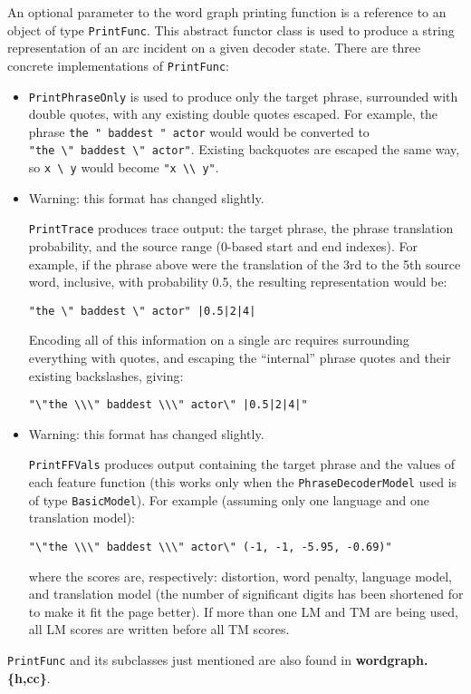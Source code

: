 \documentclass[12pt]{amsart} \usepackage{epsfig} \usepackage{rotating}
\newcommand{\file}{\textbf} \newcommand{\url}{\underline}
\newcommand{\code}{\small\texttt}
\begin{document}
An optional parameter to the word graph printing function is a reference to an
object of type \code{PrintFunc}.  This abstract functor class is used to
produce a string representation of an arc incident on a given decoder state.
There are three concrete implementations of \code{PrintFunc}:

\begin{itemize}
\item
\code{PrintPhraseOnly} is used to produce only the target phrase,
surrounded with double quotes, with any existing
double quotes escaped. For example, the phrase 
\verb/the " baddest " actor/ would would be converted to \\
\verb/"the \" baddest \" actor"/. Existing backquotes are escaped the same
way, so \verb/x \ y/ would become \verb/"x \\ y"/.

\item
Warning: this format has changed slightly.

\code{PrintTrace} produces trace output: the target phrase, the phrase
translation probability, and the source range (0-based start and end
indexes). For example, if the phrase above were the translation of the 3rd
to the 5th source word, inclusive, with probability 0.5, the resulting
representation would be:
\begin{verbatim}
"the \" baddest \" actor" |0.5|2|4|
\end{verbatim}
Encoding all of this information on a single arc requires surrounding
everything with quotes, and escaping the ``internal'' phrase quotes and their
existing backslashes, giving:
\begin{verbatim}
"\"the \\\" baddest \\\" actor\" |0.5|2|4|"
\end{verbatim}

\item
Warning: this format has changed slightly.

\code{PrintFFVals} produces output containing the target phrase and the values
of each feature function (this works only when the \code{PhraseDecoderModel}
used is of type \code{BasicModel}). For example (assuming only one language and
one translation model):
\begin{verbatim}
"\"the \\\" baddest \\\" actor\" (-1, -1, -5.95, -0.69)"
\end{verbatim}
where the scores are, respectively: distortion, word penalty, language model,
and translation model (the number of significant digits has been shortened for
to make it fit the page better). If more than one LM and TM are being used, all
LM scores are written before all TM scores.
\end{itemize}
\code{PrintFunc} and its subclasses just mentioned are also found in
\file{wordgraph.\{h,cc\}}.
\end{document}
